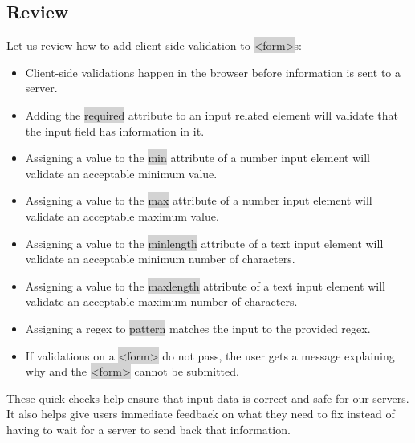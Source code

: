 \documentclass[11pt]{article}
\begin{document}
\subsection{Review}
Let us review how to add client-side validation to \colorbox{lightgray}{<form>}s: 
\begin{itemize}[leftmargin = *]
\item Client-side validations happen in the browser before information is sent to a server.
\item Adding the \colorbox{lightgray}{required} attribute to an input related element will validate that the input field has information in it.
\item Assigning a value to the \colorbox{lightgray}{min} attribute of a number input element will validate an acceptable minimum value.
\item Assigning a value to the \colorbox{lightgray}{max} attribute of a number input element will validate an acceptable maximum value.
\item Assigning a value to the \colorbox{lightgray}{minlength} attribute of a text input element will validate an acceptable minimum number of characters.
\item Assigning a value to the \colorbox{lightgray}{maxlength} attribute of a text input element will validate an acceptable maximum number of characters.
\item Assigning a regex to \colorbox{lightgray}{pattern} matches the input to the provided regex.
\item If validations on a \colorbox{lightgray}{<form>} do not pass, the user gets a message explaining why and the \colorbox{lightgray}{<form>} cannot be submitted.
\end{itemize}
These quick checks help ensure that input data is correct and safe for our servers. It also helps give users immediate feedback on what they need to fix instead of having to wait for a server to send back that information.
\end{document}
